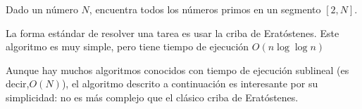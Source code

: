Dado un número $N$, encuentra todos los números primos en un segmento $[2,N]$.

La forma estándar de resolver una tarea es usar la criba de Eratóstenes. Este algoritmo es muy simple, pero tiene tiempo de ejecución $O(n\log \log n)$

Aunque hay muchos algoritmos conocidos con tiempo de ejecución sublineal (es decir,$O(N)$), el algoritmo descrito a continuación es interesante por su simplicidad: no es más complejo que el clásico criba de Eratóstenes.